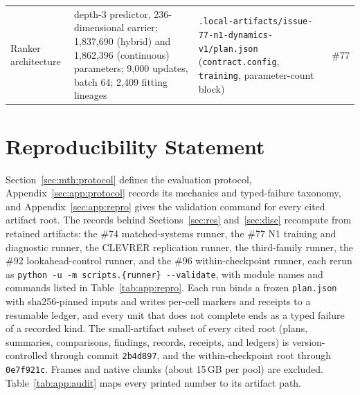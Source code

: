 {\begin{longtable}{@{}p{}p{}p{}p{}@{}}
Ranker architecture & depth-3 predictor, 236-dimensional carrier; 1{,}837{,}690 (hybrid) and 1{,}862{,}396 (continuous) parameters; 9{,}000 updates, batch 64; 2{,}409 fitting lineages & \nolinkurl{.local-artifacts/issue-77-n1-dynamics-v1/plan.json} (\texttt{contract.config}, \texttt{training}, parameter-count block) & \#77 \\
\end{longtable}
}

\section{Reproducibility Statement}

Section~\ref{sec:mth:protocol} defines the evaluation protocol, Appendix~\ref{sec:app:protocol} records its mechanics and typed-failure taxonomy, and Appendix~\ref{sec:app:repro} gives the validation command for every cited artifact root. The records behind Sections~\ref{sec:res} and~\ref{sec:disc} recompute from retained artifacts: the \#74 matched-systems runner, the \#77 N1 training and diagnostic runner, the CLEVRER replication runner, the third-family runner, the \#92 lookahead-control runner, and the \#96 within-checkpoint runner, each rerun as \texttt{python -u -m scripts.\{runner\} -{}-validate}, with module names and commands listed in Table~\ref{tab:app:repro}. Each run binds a frozen \texttt{plan.json} with sha256-pinned inputs and writes per-cell markers and receipts to a resumable ledger, and every unit that does not complete ends as a typed failure of a recorded kind. The small-artifact subset of every cited root (plans, summaries, comparisons, findings, records, receipts, and ledgers) is version-controlled through commit \texttt{2b4d897}, and the within-checkpoint root through \texttt{0e7f921c}. Frames and native chunks (about 15\,GB per pool) are excluded. Table~\ref{tab:app:audit} maps every printed number to its artifact path. %

